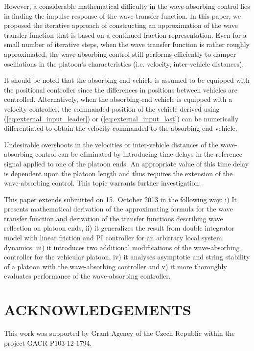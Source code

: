 \documentclass[final,5p,times,twocolumn]{elsarticle}
\begin{document}
However, a considerable mathematical difficulty in the wave-absorbing control lies in finding the impulse response of the wave transfer function. In this paper, we proposed the iterative approach of constructing an approximation of the wave transfer function that is based on a continued fraction representation. Even for a small number of iterative steps, when the wave transfer function is rather roughly approximated, the wave-absorbing control still performs efficiently to damper oscillations in the platoon's characteristics (i.e. velocity, inter-vehicle distances).

It should be noted that the absorbing-end vehicle is assumed to be equipped with the positional controller since the differences in positions between vehicles are controlled. Alternatively, when the absorbing-end vehicle is equipped with a velocity controller, the commanded position of the vehicle derived using (\ref{eq:external_input_leader}) or (\ref{eq:external_input_last}) can be numerically differentiated to obtain the velocity commanded to the absorbing-end vehicle.

Undesirable overshoots in the velocities or inter-vehicle distances of the wave-absorbing control can be eliminated by introducing time delays in the reference signal applied to one of the platoon ends. An appropriate value of this time delay is dependent upon the platoon length and thus requires the extension of the wave-absorbing control. This topic warrants further investigation.

This paper extends \cite{Martinec2014} submitted on 15.~October 2013 in the following way: i) It presents mathematical derivation of the approximating formula for the wave transfer function and derivation of the transfer functions describing wave reflection on platoon ends, ii) it generalizes the result from double integrator model with linear friction and PI controller for an arbitrary local system dynamics, iii) it introduces two additional modifications of the wave-absorbing controller for the vehicular platoon, iv) it analyses asymptotic and string stability of a platoon with the wave-absorbing controller and v) it more thoroughly evaluates performance of the wave-absorbing controller.


\section{ACKNOWLEDGEMENTS}
This work was supported by Grant Agency of the Czech Republic within the project GACR P103-12-1794.
\end{document}
